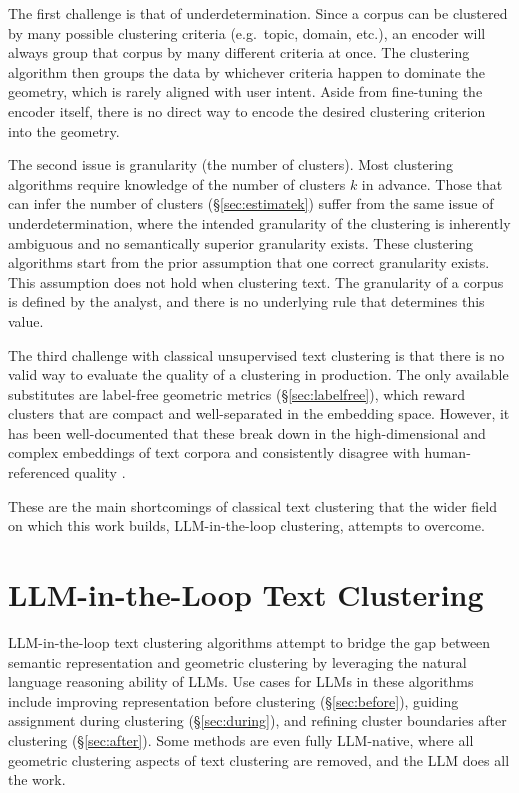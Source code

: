 \documentclass[11pt,a4paper,oneside]{report}
\begin{document}
The first challenge is that of underdetermination. Since a corpus can be clustered by many possible clustering criteria (e.g.\ topic, domain, etc.), an encoder will always group that corpus by many different criteria at once. The clustering algorithm then groups the data by whichever criteria happen to dominate the geometry, which is rarely aligned with user intent. Aside from fine-tuning the encoder itself, there is no direct way to encode the desired clustering criterion into the geometry.

The second issue is granularity (the number of clusters). Most clustering algorithms require knowledge of the number of clusters $k$ in advance. Those that can infer the number of clusters (\S\ref{sec:estimatek}) suffer from the same issue of underdetermination, where the intended granularity of the clustering is inherently ambiguous and no semantically superior granularity exists. These clustering algorithms start from the prior assumption that one correct granularity exists. This assumption does not hold when clustering text. The granularity of a corpus is defined by the analyst, and there is no underlying rule that determines this value.

The third challenge with classical unsupervised text clustering is that there is no valid way to evaluate the quality of a clustering in production. The only available substitutes are label-free geometric metrics (\S\ref{sec:labelfree}), which reward clusters that are compact and well-separated in the embedding space. However, it has been well-documented that these break down in the high-dimensional and complex embeddings of text corpora and consistently disagree with human-referenced quality \citep{petukhova2025text,wang2025deep}.

These are the main shortcomings of classical text clustering that the wider field on which this work builds, LLM-in-the-loop clustering, attempts to overcome.

\section{LLM-in-the-Loop Text Clustering}

LLM-in-the-loop text clustering algorithms attempt to bridge the gap between semantic representation and geometric clustering by leveraging the natural language reasoning ability of LLMs. Use cases for LLMs in these algorithms include improving representation before clustering (\S\ref{sec:before}), guiding assignment during clustering (\S\ref{sec:during}), and refining cluster boundaries after clustering (\S\ref{sec:after}). Some methods are even fully LLM-native, where all geometric clustering aspects of text clustering are removed, and the LLM does all the work.
\end{document}
